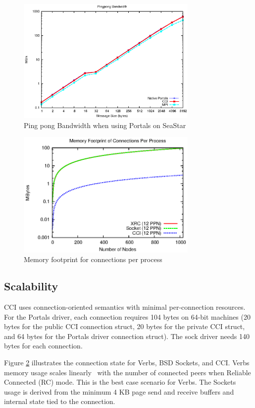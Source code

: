 \begin{figure}[htbp]
\centering
\includegraphics[width=3.45in]{pingpong-bw.eps}
\caption{Ping pong Bandwidth when using Portals on SeaStar}
\label{fig:bw}
\end{figure}

\begin{figure}[htbp]
\centering
\includegraphics[width=3.45in]{memory_log.eps}
\caption{Memory footprint for connections per process}
\label{fig:memory}
\end{figure}

\subsection{Scalability}
CCI uses connection-oriented semantics with minimal per-connection resources.
For the Portals driver, each connection requires 104 bytes on 64-bit machines
(20 bytes for the public CCI connection struct, 20 bytes for the private CCI
struct, and 64 bytes for the Portals driver connection struct).  The sock driver
needs 140 bytes for each connection.

Figure \ref{fig:memory} illustrates the connection state for
Verbs, BSD Sockets, and CCI. Verbs memory usage scales
linearly~\cite{Shipman:2008:XIS:1431669.1431683} with the number of
connected peers when Reliable Connected (RC) mode. This is
the best case scenario for Verbs. The Sockets usage is derived from
the minimum 4 KB page send and receive buffers and internal state tied
to the connection. 

